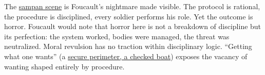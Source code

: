 The \hyperref[scene:sampan]{sampan scene} is Foucault's nightmare made visible. The protocol
is rational, the procedure is disciplined, every soldier performs his role. Yet the outcome is
horror. Foucault would note that horror here is not a breakdown of discipline but its
perfection: the system worked, bodies
were managed, the threat was neutralized. Moral revulsion has no traction within disciplinary
logic. ``Getting what one wants'' (a \hyperref[scene:sampan]{secure perimeter, a checked
	boat}) exposes the vacancy of wanting shaped entirely by procedure.
